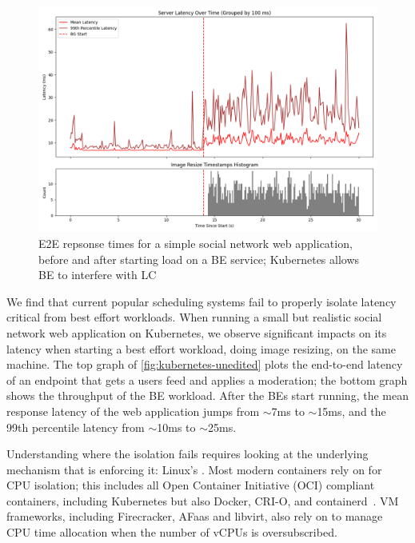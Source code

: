\begin{figure}[t]
    \centering
    \includegraphics[width=\columnwidth]{graphs/kubernetes-unedited.png}
    \caption{E2E repsonse times for a simple social network web application,
    before and after starting load on a BE service; Kubernetes allows BE to
    interfere with LC}\label{fig:kubernetes-unedited}
\end{figure}

We find that current popular scheduling systems fail to properly isolate latency
critical from best effort workloads. When running a small but realistic social
network web application on Kubernetes, we observe significant impacts on its
latency when starting a best effort workload, doing image resizing, on the same
machine. The top graph of \autoref{fig:kubernetes-unedited} plots the end-to-end
latency of an endpoint that gets a users feed and applies a moderation; the
bottom graph shows the throughput of the BE workload. After the BEs start
running, the mean response latency of the web application jumps from $\sim$7ms
to $\sim$15ms, and the 99th percentile latency from $\sim$10ms to $\sim$25ms. 

Understanding where the isolation fails requires looking at the underlying
mechanism that is enforcing it: Linux's \cgroups{}. Most modern containers rely
on \cgroups{} for CPU isolation; this includes all Open Container Initiative
(OCI) compliant containers, including Kubernetes but also Docker, CRI-O, and
containerd~\cite{oci-cgroups,docker-docs-cgroups,container-isolation-article}.
VM frameworks, including Firecracker, AFaas and libvirt, also rely on \cgroups{}
to manage CPU time allocation when the number of vCPUs is
oversubscribed.~\cite{firecracker-cgroups,afaas,libvirt-cgroups}


